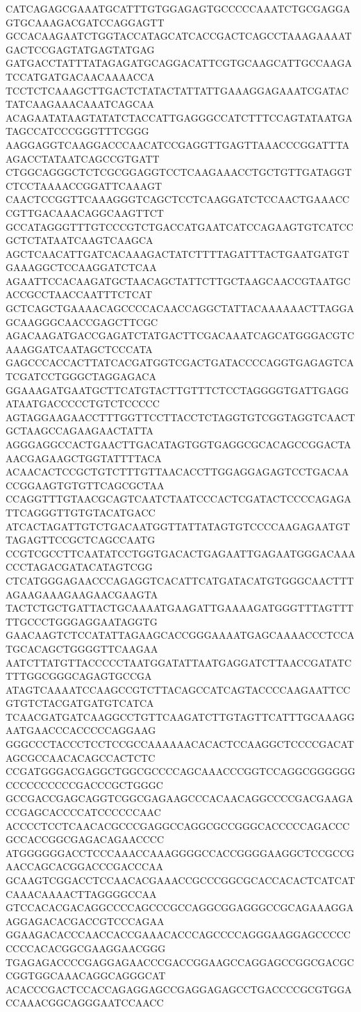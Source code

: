 CATCAGAGCGAAATGCATTTGTGGAGAGTGCCCCCAAATCTGCGAGGAGTGCAAAGACGATCCAGGAGTT
GCCACAAGAATCTGGTACCATAGCATCACCGACTCAGCCTAAAGAAAATGACTCCGAGTATGAGTATGAG
GATGACCTATTTATAGAGATGCAGGACATTCGTGCAAGCATTGCCAAGATCCATGATGACAACAAAACCA
TCCTCTCAAAGCTTGACTCTATACTATTATTGAAAGGAGAAATCGATACTATCAAGAAACAAATCAGCAA
ACAGAATATAAGTATATCTACCATTGAGGGCCATCTTTCCAGTATAATGATAGCCATCCCGGGTTTCGGG
AAGGAGGTCAAGGACCCAACATCCGAGGTTGAGTTAAACCCGGATTTAAGACCTATAATCAGCCGTGATT
CTGGCAGGGCTCTCGCGGAGGTCCTCAAGAAACCTGCTGTTGATAGGTCTCCTAAAACCGGATTCAAAGT
CAACTCCGGTTCAAAGGGTCAGCTCCTCAAGGATCTCCAACTGAAACCCGTTGACAAACAGGCAAGTTCT
GCCATAGGGTTTGTCCCGTCTGACCATGAATCATCCAGAAGTGTCATCCGCTCTATAATCAAGTCAAGCA
AGCTCAACATTGATCACAAAGACTATCTTTTAGATTTACTGAATGATGTGAAAGGCTCCAAGGATCTCAA
AGAATTCCACAAGATGCTAACAGCTATTCTTGCTAAGCAACCGTAATGCACCGCCTAACCAATTTCTCAT
GCTCAGCTGAAAACAGCCCCACAACCAGGCTATTACAAAAAACTTAGGAGCAAGGGCAACCGAGCTTCGC
AGACAAGATGACCGAGATCTATGACTTCGACAAATCAGCATGGGACGTCAAAGGATCAATAGCTCCCATA
GAGCCCACCACTTATCACGATGGTCGACTGATACCCCAGGTGAGAGTCATCGATCCTGGGCTAGGAGACA
GGAAAGATGAATGCTTCATGTACTTGTTTCTCCTAGGGGTGATTGAGGATAATGACCCCCTGTCTCCCCC
AGTAGGAAGAACCTTTGGTTCCTTACCTCTAGGTGTCGGTAGGTCAACTGCTAAGCCAGAAGAACTATTA
AGGGAGGCCACTGAACTTGACATAGTGGTGAGGCGCACAGCCGGACTAAACGAGAAGCTGGTATTTTACA
ACAACACTCCGCTGTCTTTGTTAACACCTTGGAGGAGAGTCCTGACAACCGGAAGTGTGTTCAGCGCTAA
CCAGGTTTGTAACGCAGTCAATCTAATCCCACTCGATACTCCCCAGAGATTCAGGGTTGTGTACATGACC
ATCACTAGATTGTCTGACAATGGTTATTATAGTGTCCCCAAGAGAATGTTAGAGTTCCGCTCAGCCAATG
CCGTCGCCTTCAATATCCTGGTGACACTGAGAATTGAGAATGGGACAAACCCTAGACGATACATAGTCGG
CTCATGGGAGAACCCAGAGGTCACATTCATGATACATGTGGGCAACTTTAGAAGAAAGAAGAACGAAGTA
TACTCTGCTGATTACTGCAAAATGAAGATTGAAAAGATGGGTTTAGTTTTTGCCCTGGGAGGAATAGGTG
GAACAAGTCTCCATATTAGAAGCACCGGGAAAATGAGCAAAACCCTCCATGCACAGCTGGGGTTCAAGAA
AATCTTATGTTACCCCCTAATGGATATTAATGAGGATCTTAACCGATATCTTTGGCGGGCAGAGTGCCGA
ATAGTCAAAATCCAAGCCGTCTTACAGCCATCAGTACCCCAAGAATTCCGTGTCTACGATGATGTCATCA
TCAACGATGATCAAGGCCTGTTCAAGATCTTGTAGTTCATTTGCAAAGGAATGAACCCACCCCCAGGAAG
GGGCCCTACCCTCCTCCGCCAAAAAACACACTCCAAGGCTCCCCGACATAGCGCCAACACAGCCACTCTC
CCGATGGGACGAGGCTGGCGCCCCAGCAAACCCGGTCCAGGCGGGGGGCCCCCCCCCCGACCCGCTGGGC
GCCGACCGAGCAGGTCGGCGAGAAGCCCACAACAGGCCCCGACGAAGACCGAGCACCCCATCCCCCCAAC
ACCCCTCCTCAACACGCCCGAGGCCAGGCGCCGGGCACCCCCAGACCCGCCACCGGCGAGACAGAACCCC
ATGGGGGGACCTCCCAAACCAAAGGGGCCACCGGGGAAGGCTCCGCCGAACCAGCACGGACCCGACCCAA
GCAAGTCGGACCTCCAACACGAAACCGCCCGGCGCACCACACTCATCATCAAACAAAACTTAGGGGCCAA
GTCCACACGACAGGCCCCAGCCCGCCAGGCGGAGGGCCGCAGAAAGGAAGGAGACACGACCGTCCCAGAA
GGAAGACACCCAACCACCGAAACACCCAGCCCCAGGGAAGGAGCCCCCCCCCACACGGCGAAGGAACGGG
TGAGAGACCCCGAGGAGAACCCGACCGGAAGCCAGGAGCCGGCGACGCCGGTGGCAAACAGGCAGGGCAT
ACACCCGACTCCACCAGAGGAGCCGAGGAGAGCCTGACCCCGCGTGGACCAAACGGCAGGGAATCCAACC
